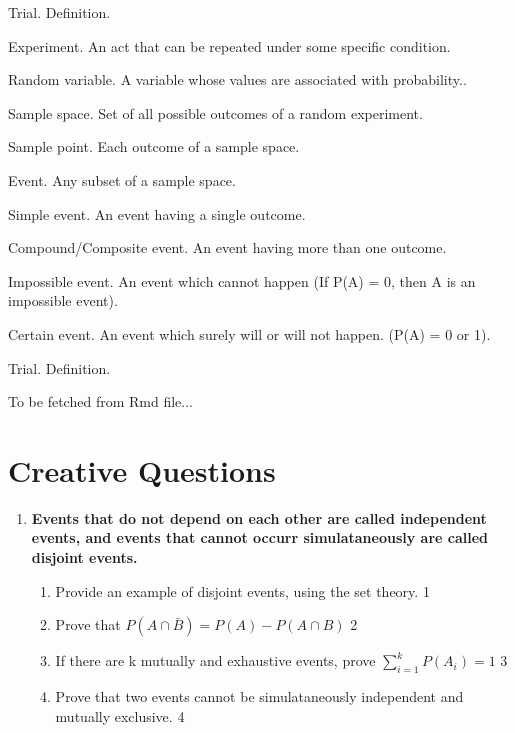 \documentclass[14pt, a4paper,oneside, margin=1.4in]{book}
\begin{document}
\begin{worddefs}
  \item[Trial.] Definition.
  
  \item[Experiment.] An act that can be repeated under some specific condition.
  
    
  \item[Random variable.] A variable whose values are associated with probability..
  
    
  \item[Sample space.] Set of all possible outcomes of a random experiment.
  
    
  \item[Sample point.]  Each outcome of a sample space.
  
    
  \item[Event.] Any subset of a sample space.
  
    
  \item[Simple event.] An event having a single outcome.
  
    
  \item[Compound/Composite event.] An event having more than one outcome.
  
    
  \item[Impossible event.] An event which cannot happen (If P(A) = 0, then A is an impossible event).
  
    
  \item[Certain event.] An event which surely will or will not happen. (P(A) = 0 or 1).
  
    
  \item[Trial.] Definition.
  
    
\end{worddefs}

To be fetched from Rmd file...


\section{Creative Questions}

\begin{enumerate}

     \item
	  \textbf{Events that do not depend on each other are called independent events, and events that cannot occurr simulataneously are called disjoint events.} 
  
  \begin{enumerate}
    \item
	Provide an example of disjoint events, using the set theory. \hfill 1
    \item
	Prove that $P(A\cap \bar B) = P(A) - P(A\cap B)$ \hfill 2
    \item  
	If there are k mutually and exhaustive events, prove $\displaystyle \sum_{i=1}^k P(A_i) = 1$ \hfill 3
    \item
	Prove that two events cannot be simulataneously independent and mutually exclusive. \hfill 4
  \end{enumerate}
    \end{enumerate}
    
\end{document}
